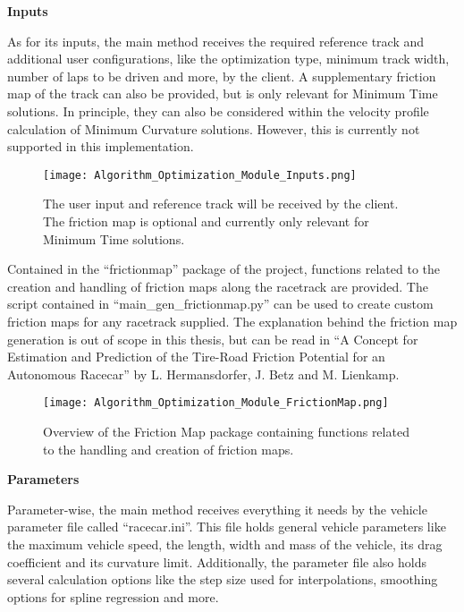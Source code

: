 \textbf{Inputs}

As for its inputs, the main method receives the required reference track and additional user configurations, like the optimization type, minimum track width, number of laps to be driven and more, by the client. A supplementary friction map of the track can also be provided, but is only relevant for Minimum Time solutions. In principle, they can also be considered within the velocity profile calculation of Minimum Curvature solutions. However, this is currently not supported in this implementation. %
\begin{figure}[H]
    \centering
    \texttt{[image: Algorithm\_Optimization\_Module\_Inputs.png]}
    \caption{The user input and reference track will be received by the client. The friction map is optional and currently only relevant for Minimum Time solutions.}
    \label{fig:Optimization Algorithm Module Inputs}
\end{figure}

Contained in the ``frictionmap'' package of the project, functions related to the creation and handling of friction maps along the racetrack are provided.
The script contained in ``main\_gen\_frictionmap.py'' can be used to create custom friction maps for any racetrack supplied. The explanation behind the friction map generation is out of scope in this thesis, but can be read in ``A Concept for Estimation and Prediction of the Tire-Road Friction Potential for an Autonomous Racecar'' by L. Hermansdorfer, J. Betz and M. Lienkamp. \cite{friction_map_generation}
\begin{figure}[H]
    \centering
    \texttt{[image: Algorithm\_Optimization\_Module\_FrictionMap.png]}
    \caption{Overview of the Friction Map package containing functions related to the handling and creation of friction maps.}
    \label{fig:Optimization Algorithm Module Overview}
\end{figure}

\textbf{Parameters}

Parameter-wise, the main method receives everything it needs by the vehicle parameter file called ``racecar.ini''. This file holds general vehicle parameters like the maximum vehicle speed, the length, width and mass of the vehicle, its drag coefficient and its curvature limit. Additionally, the parameter file also holds several calculation options like the step size used for interpolations, smoothing options for spline regression and more.

